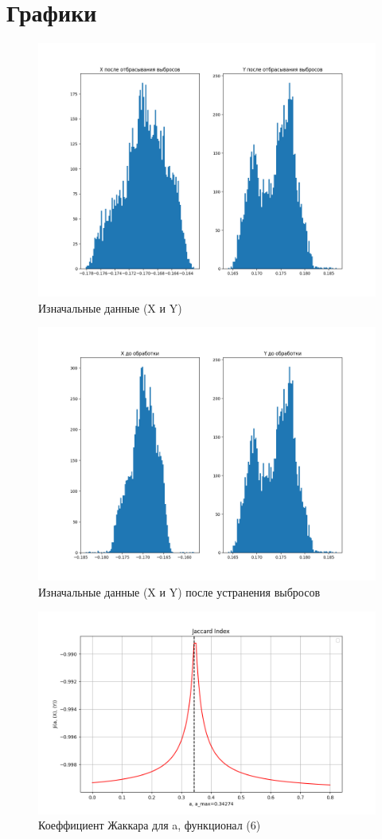 \documentclass[a4paper,12pt]{article}
\begin{document}
\section{Графики}
\begin{figure}[h!]
    \centering
    \includegraphics[width=0.7\linewidth]{XYafter.png}
    \caption{Изначальные данные (X и Y)}
\end{figure}
\begin{figure}[h!]
    \centering
    \includegraphics[width=0.7\linewidth]{XYbefore.png}
    \caption{Изначальные данные (X и Y) после устранения выбросов}
\end{figure}
\newpage
\begin{figure}[h!]
    \centering
    \includegraphics[width=0.9\linewidth]{Jaccard-a-.png}
    \caption{Коеффициент Жаккара для a, функционал (6)}
\end{figure}
\end{document}
